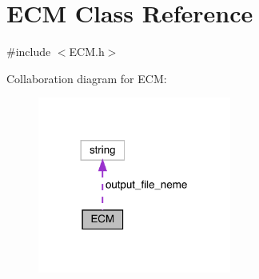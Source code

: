 \hypertarget{classECM}{}\section{E\+CM Class Reference}
\label{classECM}


{\ttfamily \#include $<$E\+C\+M.\+h$>$}



Collaboration diagram for E\+CM\+:
\nopagebreak
\begin{figure}[H]
\begin{center}
\leavevmode
\includegraphics[width=180pt]{classECM__coll__graph}
\end{center}
\end{figure}
